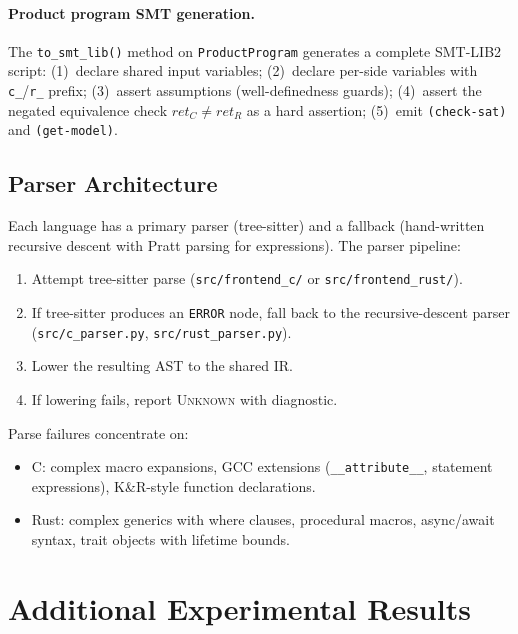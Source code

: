 \documentclass[10pt,a4paper]{article}
\begin{document}
\begin{appendices}
\paragraph{Product program SMT generation.}
The \texttt{to\_smt\_lib()} method on \texttt{ProductProgram}
generates a complete SMT-LIB2 script:
(1)~declare shared input variables;
(2)~declare per-side variables with \texttt{c\_}/\texttt{r\_} prefix;
(3)~assert assumptions (well-definedness guards);
(4)~assert the negated equivalence check
$\mathit{ret}_C \neq \mathit{ret}_R$ as a hard assertion;
(5)~emit \texttt{(check-sat)} and \texttt{(get-model)}.

\subsection{Parser Architecture}

Each language has a primary parser (tree-sitter) and a fallback
(hand-written recursive descent with Pratt parsing for expressions).
The parser pipeline:
\begin{enumerate}[nosep]
  \item Attempt tree-sitter parse (\texttt{src/frontend\_c/} or
    \texttt{src/frontend\_rust/}).
  \item If tree-sitter produces an \texttt{ERROR} node, fall back to
    the recursive-descent parser (\texttt{src/c\_parser.py},
    \texttt{src/rust\_parser.py}).
  \item Lower the resulting AST to the shared IR.
  \item If lowering fails, report \textsc{Unknown} with diagnostic.
\end{enumerate}

Parse failures concentrate on:
\begin{itemize}[nosep]
  \item C: complex macro expansions, GCC extensions
    (\texttt{\_\_attribute\_\_}, statement expressions),
    K\&R-style function declarations.
  \item Rust: complex generics with where clauses, procedural macros,
    async/await syntax, trait objects with lifetime bounds.
\end{itemize}


\section{Additional Experimental Results}\label{app:experiments}


\end{appendices}
\end{document}
